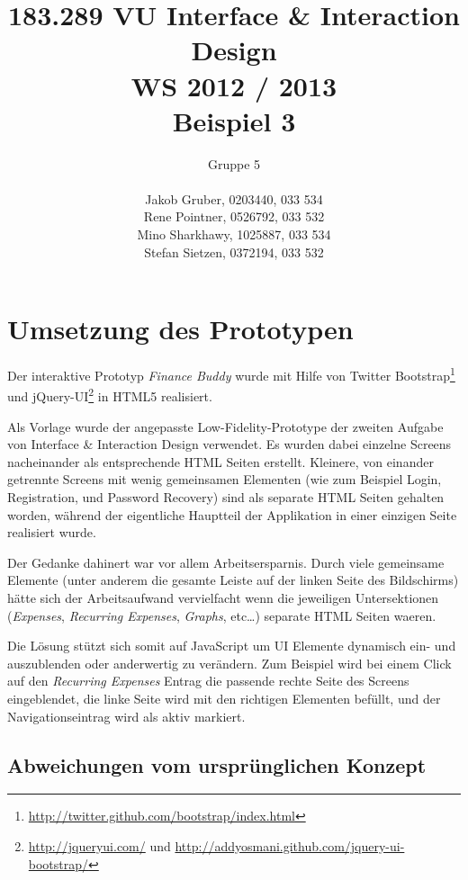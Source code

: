 \documentclass[a4paper,10pt]{article}
\title{
    183.289 VU Interface \& Interaction Design \\
    WS 2012 / 2013 \\
    Beispiel 3}
\author{
    Gruppe 5 \\ \\
    Jakob Gruber, 0203440, 033 534 \\
    Rene Pointner, 0526792, 033 532\\
    Mino Sharkhawy, 1025887, 033 534 \\
    Stefan Sietzen, 0372194, 033 532}
\begin{document}
\maketitle

\clearpage
\tableofcontents

\clearpage
\section{Umsetzung des Prototypen}

Der interaktive Prototyp \emph{Finance Buddy} wurde mit Hilfe von Twitter
Bootstrap\footnote{\url{http://twitter.github.com/bootstrap/index.html}}
und jQuery-UI\footnote{\url{http://jqueryui.com/} und
\url{http://addyosmani.github.com/jquery-ui-bootstrap/}} in HTML5 realisiert.

Als Vorlage wurde der angepasste Low-Fidelity-Prototype der zweiten Aufgabe von Interface \&
Interaction Design verwendet. Es wurden dabei einzelne Screens nacheinander als
entsprechende HTML Seiten erstellt. Kleinere, von einander getrennte Screens mit
wenig gemeinsamen Elementen (wie zum Beispiel Login, Registration, und Password Recovery)
sind als separate HTML Seiten gehalten worden, w\"ahrend der eigentliche Hauptteil
der Applikation in einer einzigen Seite realisiert wurde.

Der Gedanke dahinert war vor allem Arbeitsersparnis. Durch viele gemeinsame Elemente (unter
anderem die gesamte Leiste auf der linken Seite des Bildschirms) h\"atte sich der
Arbeitsaufwand vervielfacht wenn die jeweiligen Untersektionen (\emph{Expenses},
\emph{Recurring Expenses}, \emph{Graphs}, etc\ldots) separate HTML Seiten waeren.

Die L\"osung st\"utzt sich somit auf JavaScript um UI Elemente dynamisch ein- und
auszublenden oder anderwertig zu ver\"andern. Zum Beispiel wird bei einem Click auf
den \emph{Recurring Expenses} Entrag die passende rechte Seite des Screens eingeblendet,
die linke Seite wird mit den richtigen Elementen bef\"ullt, und der Navigationseintrag
wird als aktiv markiert.

\subsection{Abweichungen vom urspr\"unglichen Konzept}
\end{document}

